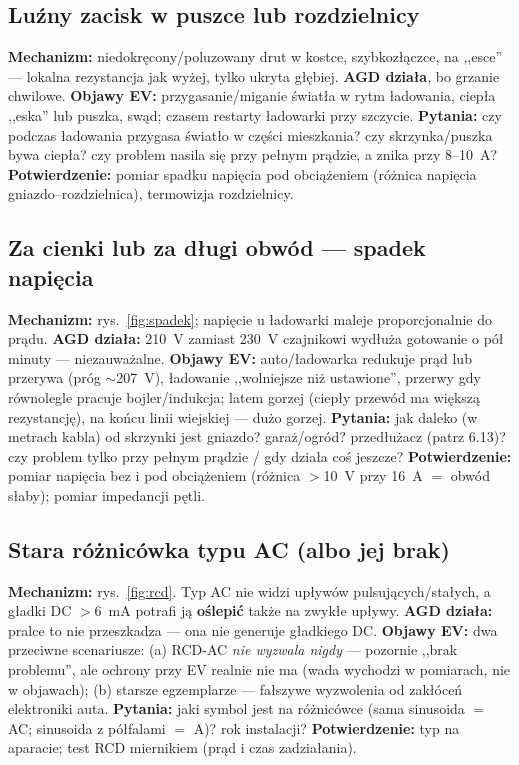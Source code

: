 \documentclass[11pt,a4paper]{article}
\begin{document}
\subsection{Luźny zacisk w puszce lub rozdzielnicy}
\textbf{Mechanizm:} niedokręcony/poluzowany drut w kostce, szybkozłączce, na ,,esce'' --- lokalna
rezystancja jak wyżej, tylko ukryta głębiej. \textbf{AGD działa}, bo grzanie chwilowe.
\textbf{Objawy EV:} przygasanie/miganie światła w rytm ładowania, ciepła ,,eska'' lub puszka,
swąd; czasem restarty ładowarki przy szczycie. \textbf{Pytania:} czy podczas ładowania przygasa
światło w części mieszkania? czy skrzynka/puszka bywa ciepła? czy problem nasila się przy pełnym
prądzie, a znika przy 8--10~A? \textbf{Potwierdzenie:} pomiar spadku napięcia pod obciążeniem
(różnica napięcia gniazdo--rozdzielnica), termowizja rozdzielnicy.

\subsection{Za cienki lub za długi obwód --- spadek napięcia}
\textbf{Mechanizm:} rys.~\ref{fig:spadek}; napięcie u ładowarki maleje proporcjonalnie do prądu.
\textbf{AGD działa:} 210~V zamiast 230~V czajnikowi wydłuża gotowanie o pół minuty --- niezauważalne.
\textbf{Objawy EV:} auto/ładowarka redukuje prąd lub przerywa (próg $\sim$207~V), ładowanie
,,wolniejsze niż ustawione'', przerwy gdy równolegle pracuje bojler/indukcja; latem gorzej (ciepły
przewód ma większą rezystancję), na końcu linii wiejskiej --- dużo gorzej.
\textbf{Pytania:} jak daleko (w metrach kabla) od skrzynki jest gniazdo? garaż/ogród? przedłużacz
(patrz 6.13)? czy problem tylko przy pełnym prądzie / gdy działa coś jeszcze?
\textbf{Potwierdzenie:} pomiar napięcia bez i pod obciążeniem (różnica $>$10~V przy 16~A $=$
obwód słaby); pomiar impedancji pętli.

\subsection{Stara różnicówka typu AC (albo jej brak)}
\textbf{Mechanizm:} rys.~\ref{fig:rcd}. Typ AC nie widzi upływów pulsujących/stałych, a gładki DC
$>$6~mA potrafi ją \textbf{oślepić} także na zwykłe upływy. \textbf{AGD działa:} pralce to nie
przeszkadza --- ona nie generuje gładkiego DC. \textbf{Objawy EV:} dwa przeciwne scenariusze:
(a) RCD-AC \emph{nie wyzwala nigdy} --- pozornie ,,brak problemu'', ale ochrony przy EV realnie
nie ma (wada wychodzi w pomiarach, nie w objawach); (b) starsze egzemplarze --- fałszywe
wyzwolenia od zakłóceń elektroniki auta. \textbf{Pytania:} jaki symbol jest na różnicówce (sama
sinusoida $=$ AC; sinusoida z półfalami $=$ A)? rok instalacji? \textbf{Potwierdzenie:} typ na
aparacie; test RCD miernikiem (prąd i czas zadziałania).
\end{document}
